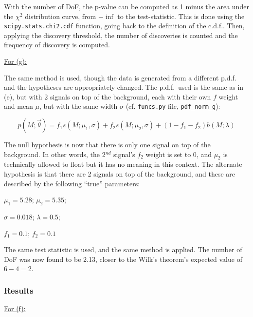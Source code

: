 \documentclass[12pt]{report} %
\begin{document}
With the number of DoF, the p-value can be computed as 1 minus the area under the $\chi^{2}$ distribution curve, from $-\inf$ to the test-statistic. This is done using the \texttt{scipy.stats.chi2.cdf} function, going back to the definition of the c.d.f.. Then, applying the discovery threshold, the number of discoveries is counted and the frequency of discovery is computed.

\vspace*{1\baselineskip}
\underline{For (g):} 

\vspace*{1\baselineskip}
The same method is used, though the data is generated from a different p.d.f. and the hypotheses are appropriately changed. The p.d.f.\ used is the same as in (e), but with 2 signals on top of the background, each with their own $f$ weight and mean $\mu$, but with the same width $\sigma$ (cf. \texttt{funcs.py} file, \texttt{pdf\_norm\_g}):  

\begin{equation}
    p(M;\vec{\theta}) = f_{1}s(M;\mu_{1},\sigma) + f_{2}s(M;\mu_{2},\sigma) + (1 - f_{1} - f_{2})b(M;\lambda)
\end{equation}


The null hypothesis is now that there is only one signal on top of the background. In other words, the 2$^{nd}$ signal's $f_{2}$ weight is set to 0, and $\mu_{2}$ is technically allowed to float but it has no meaning in this context. The alternate hypothesis is that there are 2 signals on top of the background, and these are described by the following ``true'' parameters:

\begin{center}
    $\mu_{1} = 5.28$;  
    $\mu_{2} = 5.35$;  

    $\sigma = 0.018$;
    $\lambda = 0.5$;  

    $f_{1} = 0.1$;
    $f_{2} = 0.1$
\end{center}

The same test statistic is used, and the same method is applied. The number of DoF was now found to be 2.13, closer to the Wilk's theorem's expected value of $6 - 4 = 2$.

\subsubsection*{Results}

\underline{For (f):}

\vspace*{1\baselineskip}
\end{document}
